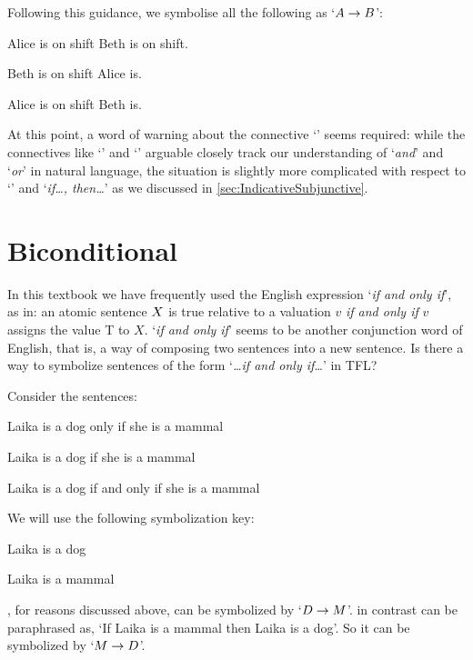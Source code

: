 	
	\noindent Following this guidance, we symbolise all the following as `$A\rightarrow B$':
	\begin{samplesent}
		\item\label{sent:ifthen1}  Alice is on shift  Beth is on shift.
		\item\label{sent:ifthen2}  Beth is on shift  Alice is.
		\item\label{sent:ifthen3}  Alice is on shift  Beth is.
	\end{samplesent}

 At this point, a word of warning about the connective `\eif'  seems required: while the connectives like `\eand' and `\eor' arguable closely track our understanding of `\emph{and}' and `\emph{or}' in natural language, the situation is slightly more complicated with respect to `\eif' and `\emph{if\ldots, then\ldots}' as we discussed in \cref{sec:IndicativeSubjunctive}.

\section{Biconditional}\label{sec:SymbolisingTFL:bicond}
In this textbook we have frequently used the English expression `\emph{if and only if}', as in: an atomic sentence $X$ is true relative to a valuation $v$ \emph{if and only if} $v$ assigns the value T to $X$. `\emph{if and only if}' seems to be another conjunction word of English, that is, a way of composing two sentences into a new sentence. Is there a way to symbolize sentences of the form `\emph{\ldots if and only if\ldots}' in TFL?

Consider the sentences:
	\begin{samplesent}
		\item\label{sent:iff1} Laika is a dog only if she is a mammal
		\item\label{sent:iff2} Laika is a dog if she is a mammal
		\item\label{sent:iff3} Laika is a dog if and only if she is a mammal
	\end{samplesent}
We will use the following symbolization key:
	\begin{ekey}
		\item[D] Laika is a dog
		\item[M] Laika is a mammal
	\end{ekey}
, for reasons discussed above, can be symbolized by `$D \rightarrow M$'. in contrast  can be paraphrased as, `If Laika is a mammal then Laika is a dog'. So it can be symbolized by `$M \rightarrow D$'.

